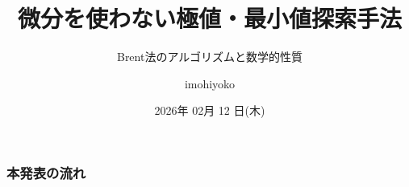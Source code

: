 \documentclass[dvipdfmx,12pt,aspectratio=169]{beamer}
\title{微分を使わない極値・最小値探索手法}
\subtitle{Brent法のアルゴリズムと数学的性質}
\author{imohiyoko}
\date{2026年 02月 12 日(木)}
\theoremstyle{definition} %
\begin{document}
\maketitle

\begin{frame}
 \frametitle{本発表の流れ}
 \tableofcontents
\end{frame}

\end{document}
